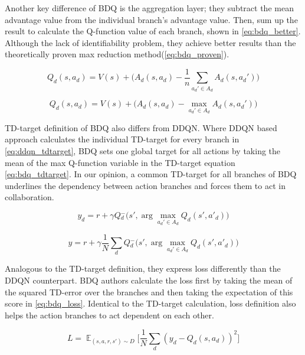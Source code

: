 Another key difference of BDQ is the aggregation layer; they subtract the mean advantage value from the individual branch's advantage value. Then, sum up the result to calculate the Q-function value of each branch, shown in \ref{eq:bdq_better}. Although the lack of identifiability problem, they achieve better results than the theoretically proven max reduction method(\ref{eq:bdq_proven}).

\begin{equation}
    Q_d(s, a_d) = V(s) + \Big(A_d(s, a_d) - \frac{1}{n} \sum\limits_{a_d'\in A_d}A_d(s, a_d')\Big)
    \label{eq:bdq_better}
\end{equation}


\begin{equation}
    Q_d(s, a_d) = V(s) + \Big(A_d(s, a_d) - \max\limits_{a_d'\in A_d}A_d(s, a_d')\Big)
    \label{eq:bdq_proven}
\end{equation}


TD-target definition of BDQ also differs from DDQN. Where DDQN based approach calculates the individual TD-target for every branch in \ref{eq:ddqn_tdtarget}, BDQ sets one global target for all actions by taking the mean of the max Q-function variable in the TD-target equation \ref{eq:bdq_tdtarget}. In our opinion, a common TD-target for all branches of BDQ underlines the dependency between action branches and forces them to act in collaboration.

\begin{equation}
    y_d = r + \gamma Q{_d^-}\Big(s', \arg\max\limits_{a_d'\in A_d}Q_d(s', a'_d)\Big)
    \label{eq:ddqn_tdtarget}
\end{equation}

\begin{equation}
    y = r + \gamma \frac{1}{N} \sum\limits_d Q{_d^-}\Big(s', \arg\max\limits_{a_d'\in A_d}Q_d(s', a'_d)\Big)
    \label{eq:bdq_tdtarget}
\end{equation}


Analogous to the TD-target definition, they express loss differently than the DDQN counterpart. BDQ authors calculate the loss first by taking the mean of the squared TD-error over the branches and then taking the expectation of this score in \ref{eq:bdq_loss}. Identical to the TD-target calculation, loss definition also helps the action branches to act dependent on each other.

\begin{equation}
    L = \mathop{\mathbb{E}}_{(s,a,r,s')\sim D} \Big[\frac{1}{N}\sum\limits_d(y_d-Q_d(s,a_d))^2]
    \label{eq:bdq_loss}
\end{equation}

